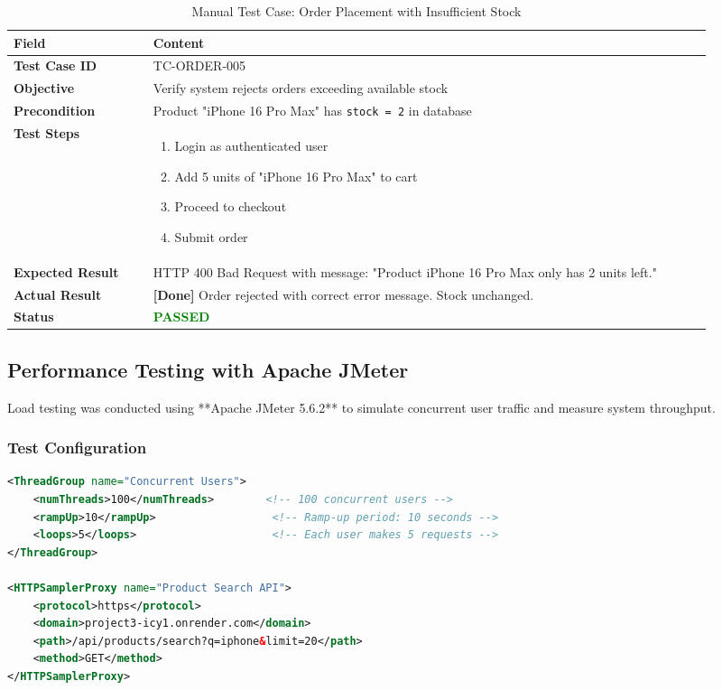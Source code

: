 \documentclass[12pt, a4paper]{report}
\begin{document}
\begin{table}[H]
\centering
\caption{Manual Test Case: Order Placement with Insufficient Stock}
\label{tab:test_stock}
\small
\begin{tabular}{@{}p{0.18\linewidth}p{0.72\linewidth}@{}}
\toprule
\textbf{Field} & \textbf{Content} \\
\midrule
\textbf{Test Case ID} & TC-ORDER-005 \\
\textbf{Objective} & Verify system rejects orders exceeding available stock \\
\textbf{Precondition} & Product "iPhone 16 Pro Max" has \texttt{stock = 2} in database \\
\textbf{Test Steps} & 
\begin{minipage}[t]{\linewidth}
\begin{enumerate}[nosep,leftmargin=*]
    \item Login as authenticated user
    \item Add 5 units of "iPhone 16 Pro Max" to cart
    \item Proceed to checkout
    \item Submit order
\end{enumerate}
\end{minipage} \\
\textbf{Expected Result} & HTTP 400 Bad Request with message: "Product iPhone 16 Pro Max only has 2 units left." \\
\textbf{Actual Result} & \textbf{[Done]} Order rejected with correct error message. Stock unchanged. \\
\textbf{Status} & \textcolor{green}{\textbf{PASSED}} \\
\bottomrule
\end{tabular}
\end{table}

\subsection{Performance Testing with Apache JMeter}

Load testing was conducted using **Apache JMeter 5.6.2** to simulate concurrent user traffic and measure system throughput.

\subsubsection{Test Configuration}

\begin{lstlisting}[language=XML, caption=JMeter Test Plan Configuration]
<ThreadGroup name="Concurrent Users">
    <numThreads>100</numThreads>        <!-- 100 concurrent users -->
    <rampUp>10</rampUp>                  <!-- Ramp-up period: 10 seconds -->
    <loops>5</loops>                     <!-- Each user makes 5 requests -->
</ThreadGroup>

<HTTPSamplerProxy name="Product Search API">
    <protocol>https</protocol>
    <domain>project3-icy1.onrender.com</domain>
    <path>/api/products/search?q=iphone&limit=20</path>
    <method>GET</method>
</HTTPSamplerProxy>
\end{lstlisting}
\end{document}
